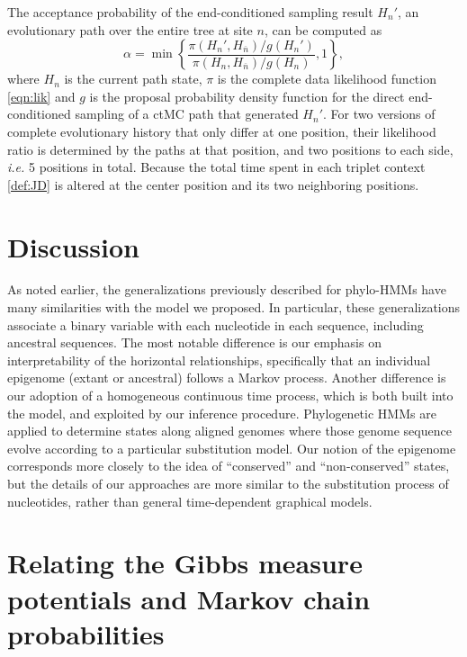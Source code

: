 \documentclass[11pt]{article}
\begin{document}
The acceptance probability of the end-conditioned sampling result
$H_n'$, an evolutionary path over the entire tree at site $n$, can be
computed as
\begin{equation}\label{def:accept}
  \alpha = \min\left\{\frac{\pi(H_n', H_{\overline{n}})/g(H_n')}{\pi(H_n, H_{\overline{n}})/g(H_n)}, 1\right\},
\end{equation}
where $H_n$ is the current path state, $\pi$ is the complete data
likelihood function \eqref{eqn:lik} and $g$ is the proposal
probability density function for the direct end-conditioned sampling
of a ctMC path that generated $H_n'$.  For two versions of complete
evolutionary history that only differ at one position, their
likelihood ratio is determined by the paths at that position, and two
positions to each side, \textit{i.e.} 5 positions in total. Because
the total time spent in each triplet context \eqref{def:JD} is altered
at the center position and its two neighboring positions.

\section{Discussion}

As noted earlier, the generalizations previously described for
phylo-HMMs have many similarities with the model we proposed. In
particular, these generalizations associate a binary variable with
each nucleotide in each sequence, including ancestral sequences.  The
most notable difference is our emphasis on interpretability of the
horizontal relationships, specifically that an individual epigenome
(extant or ancestral) follows a Markov process. Another difference is
our adoption of a homogeneous continuous time process, which is both
built into the model, and exploited by our inference
procedure. Phylogenetic HMMs are applied to determine states along
aligned genomes where those genome sequence evolve according to a
particular substitution model. Our notion of the epigenome corresponds
more closely to the idea of ``conserved'' and ``non-conserved''
states, but the details of our approaches are more similar to the
substitution process of nucleotides, rather than general
time-dependent graphical models.

\clearpage




\clearpage

\appendix

\section{Relating the Gibbs measure potentials and Markov chain probabilities}
\end{document}
